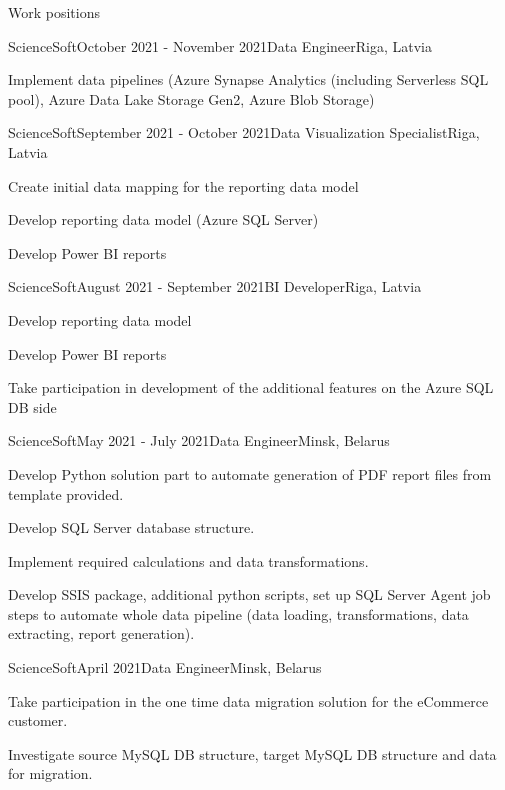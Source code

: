 \documentclass{resume} %
\begin{document}
\begin{rSection}{Work positions}
\begin{rSubsection}{ScienceSoft}{October 2021 - November 2021}{Data Engineer}{Riga, Latvia}
\item Implement data pipelines (Azure Synapse Analytics (including Serverless SQL pool), Azure Data Lake Storage Gen2, Azure Blob Storage)
\end{rSubsection}

\begin{rSubsection}{ScienceSoft}{September 2021 - October 2021}{Data Visualization Specialist}{Riga, Latvia}
\item Create initial data mapping for the reporting data model
\item Develop reporting data model (Azure SQL Server)
\item Develop Power BI reports
\end{rSubsection}

\begin{rSubsection}{ScienceSoft}{August 2021 - September 2021}{BI Developer}{Riga, Latvia}
\item Develop reporting data model
\item Develop Power BI reports
\item Take participation in development of the additional features on the Azure SQL DB side
\end{rSubsection}

\begin{rSubsection}{ScienceSoft}{May 2021 - July 2021}{Data Engineer}{Minsk, Belarus}
\item Develop Python solution part to automate generation of PDF report files from template provided.
\item Develop SQL Server database structure.
\item Implement required calculations and data transformations.
\item Develop SSIS package, additional python scripts, set up SQL Server Agent job steps to automate whole data pipeline (data loading, transformations, data extracting, report generation).
\end{rSubsection}

\begin{rSubsection}{ScienceSoft}{April 2021}{Data Engineer}{Minsk, Belarus}
\item Take participation in the one time data migration solution for the eCommerce customer.
\item Investigate source MySQL DB structure, target MySQL DB structure and data for migration.
\end{rSubsection}


\end{rSection}
\end{document}
